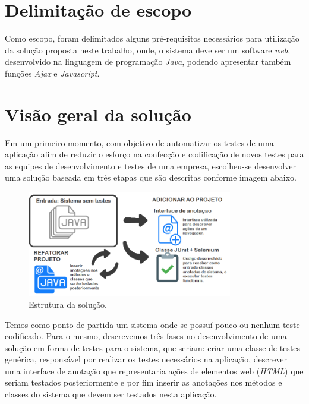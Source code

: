 \documentclass[tg]{mdtufsm}
\begin{document}
\section{Delimitação de escopo}

Como escopo, foram delimitados alguns pré-requisitos necessários para utilização da solução proposta neste trabalho, onde, o sistema deve ser um software \emph{web}, desenvolvido na linguagem de programação \emph{Java}, podendo apresentar também funções \emph{Ajax} e \emph{Javascript}.

\section{Visão geral da solução}
Em um primeiro momento, com objetivo de automatizar os testes de uma aplicação afim de reduzir o esforço na confecção e codificação de novos testes para as equipes de desenvolvimento e testes de uma empresa, escolheu-se desenvolver uma solução baseada em três etapas que são descritas conforme imagem abaixo.

\begin{figure}[!htb]
	\centering
	\includegraphics[width=0.8\textwidth]{solucao1}
	\caption{Estrutura da solução.}
	\label{fig:solucao1	}
\end{figure}

Temos como ponto de partida um sistema onde se possuí pouco ou nenhum teste codificado. Para o mesmo, descrevemos  três fases no desenvolvimento de uma solução em forma de testes para o sistema, que seriam: criar uma classe de testes genérica, responsável por realizar os testes necessários na aplicação,
descrever uma interface de anotação que representaria ações de elementos web (\emph{HTML}) que seriam testados posteriormente e por fim inserir as anotações nos métodos e classes do sistema que devem ser testados nesta aplicação.
\end{document}
